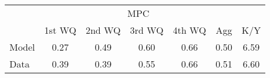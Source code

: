 \begin{tabular}{@{}lcccccc@{}} 
\toprule 
                  & \multicolumn{5}{c}{MPC} &   \\   
                  &  1st WQ  & 2nd WQ  & 3rd WQ & 4th WQ  & Agg  &  K/Y  \\  \midrule 
Model &0.27 & 0.49 & 0.60 & 0.66 & 0.50 & 6.59 \\ 
Data &0.39 & 0.39 & 0.55 & 0.66 & 0.51 & 6.60 \\ 
\end{tabular}  
